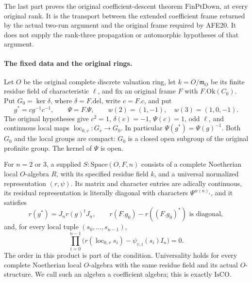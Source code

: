 \documentclass[11pt,a4paper]{article}
\numberwithin{equation}{section}
\theoremstyle{remark}\newtheorem{remark}[theorem]{Remark}
\begin{document}
The last part proves the original coefficient-descent theorem
\(\mathrm{FinPtDown}\), at every original rank.  It is the transport
between the extended coefficient frame returned by the actual two-run
argument and the original frame required by AFE20.  It does not supply
the rank-three propagation or automorphic hypotheses of that argument.

\paragraph{The fixed data and the original rings.}
Let \(O\) be the original complete discrete valuation ring, let
\(k=O/\mathfrak m_O\) be its finite residue field of characteristic
\(\ell\), and fix an original frame \(F\) with
\(F.\mathrm{Ok}(C_0)\).  Put \(G_0=\ker\delta\), where
\(\delta=F.\mathrm{del}\), write \(c=F.c\), and put
\[
 g^*=cg^{-1}c^{-1},\qquad \Psi=F.\Psi,
 \qquad w(2)=(1,-1),\quad w(3)=(1,0,-1).
                                                        \tag{RTC.1}
\]
The original hypotheses give \(c^2=1\), \(\delta(c)=-1\),
\(\Psi(c)=1\), odd \(\ell\), and continuous local maps
\(\operatorname{loc}_{0,v}:G_v\to G_0\).  In particular
\(\Psi(g^*)=\Psi(g)^{-1}\).  Both \(G_0\) and the local groups
are compact: \(G_0\) is a closed open subgroup of the original
profinite group.  The kernel of \(\Psi\) is open.

For \(n=2\) or \(3\), a supplied
\(S:\mathrm{Space}(O,F,n)\) consists of a complete Noetherian
local \(O\)-algebra \(R\), with its specified residue field \(k\),
and a universal normalized representation \((r,\psi)\).  Its
matrix and character entries are adically continuous, its residual
representation is literally diagonal with characters
\(\Psi^{w(n)_i}\), and it satisfies
\[
 r(g^*)=J_nr(g)^tJ_n,\qquad
 r(F.g_0)-r((F.g_0)^*)\text{ is diagonal},
                                                        \tag{RTC.2}
\]
and, for every local tuple \((s_0,\ldots,s_{n-1})\),
\[
 \prod_{i=0}^{n-1}
 \bigl(r(\operatorname{loc}_{0,v}s_i)-\psi_{v,i}(s_i)I_n\bigr)=0.
                                                        \tag{RTC.3}
\]
The order in this product is part of the condition.  Universality
holds for every complete Noetherian local \(O\)-algebra with the
same residue field and its actual \(O\)-structure.  We call such
an algebra a coefficient algebra; this is exactly \(\mathrm{IsCO}\).
\end{document}
